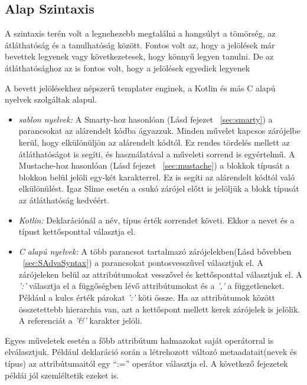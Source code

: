   

\subsection{Alap Szintaxis}
\label{sec:SBaseSyntax}
A szintaxis terén volt a legnehezebb megtalálni a hangsúlyt a tömörség, az átláthatóság és a tanulhatóság között. 
Fontos volt az, hogy a jelölések már bevettek legyenek vagy következetesek, hogy könnyű legyen tanulni. 
De az átláthatósághoz az is fontos volt, hogy a jelölések egyediek legyenek

A bevett jelölésekhez népszerű templater enginek, a Kotlin és más C alapú nyelvek szolgáltak alapul.
\begin{itemize}
\item \emph{sablon nyelvek:}
A Smarty-hoz hasonlóan (Lásd fejezet ~\ref{sec:smarty}) a parancsokat az alárendelt kódba ágyazzuk.
Minden művelet kapcsos zárójelbe kerül, hogy elkülönüljön az alárendelt kódtól.
Ez rendes tördelés mellett az átláthatóságot is segíti, és használatával a műveleti sorrend is egyértelmű. 
A Mustache-hoz hasonlóan (Lásd fejezet ~\ref{sec:mustache}) a blokkok típusát a blokkon belül jelöli egy-két karakterrel.
Ez is segíti az alárendelt kódtól való elkülönülést.
Igaz Slime esetén a csukó zárójel előtt is jelöljük a blokk típusát az átláthatóság kedvéért.
\item \emph{Kotlin:}
Deklarációnál a név, típus érték sorrendet követi.
Ekkor a nevet és a típust kettősponttal választja el.
\item \emph{C alapú nyelvek:}
A több parancsot tartalmazó zárójelekben(Lásd bővebben ~\ref{sec:SAdvaSyntax}) a parancsokat pontosvesszűvel választjuk el.
A zárójeleken belül az attribútumokat vesszővel és kettősponttal választjuk el.
A \textit{':'} választja el a függőségben lévő attribútumokat és a \textit{','} a függetleneket. 
Például a kulcs érték párokat \textit{':'} köti össze.
Ha az attribútumok között összetettebb hierarchia van, azt a kettőspont mellett kerek zárójelek is jelölik. 
A referenciát a \textit{'\&'} karakter jelöli.
\end{itemize} 
Egyes műveletek esetén a főbb attribútum halmazokat saját operátorral is elválasztjuk. 
Például deklaráció során a létrehozott változó metaadatait(nevek és típus) az attribútumaitól egy “:=” operátor választja el.
A következő fejezetek példái jól szemléltetik ezeket is.


